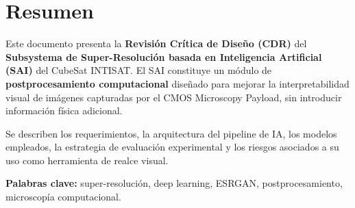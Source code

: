 \documentclass[12pt]{report}
\begin{document}
\section*{Resumen}

Este documento presenta la \textbf{Revisión Crítica de Diseño (CDR)} del
\textbf{Subsystema de Super-Resolución basada en Inteligencia Artificial (SAI)}
del CubeSat INTISAT. El SAI constituye un módulo de \textbf{postprocesamiento
computacional} diseñado para mejorar la interpretabilidad visual de imágenes
capturadas por el CMOS Microscopy Payload, sin introducir información física
adicional.

Se describen los requerimientos, la arquitectura del pipeline de IA, los modelos
empleados, la estrategia de evaluación experimental y los riesgos asociados a su
uso como herramienta de realce visual.

\textbf{Palabras clave:} super-resolución, deep learning, ESRGAN, postprocesamiento,
microscopía computacional.

\clearpage
\tableofcontents
\clearpage

\setcounter{page}{1}
\pagestyle{fancy}


\appendix

% 
% 
\end{document}
